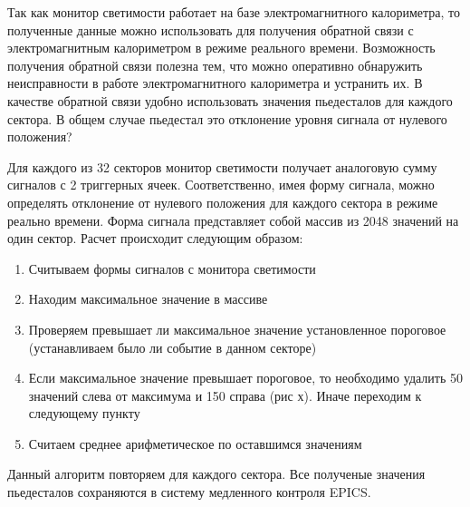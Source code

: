   Так как монитор светимости работает на базе электромагнитного калориметра, то полученные данные можно использовать для получения обратной связи с электромагнитным калориметром в режиме реального времени. Возможность получения обратной связи полезна тем, что можно оперативно обнаружить неисправности в работе электромагнитного калориметра и устранить их. В качестве обратной связи удобно использовать значения пьедесталов для каждого сектора. В общем случае пьедестал это отклонение уровня сигнала от нулевого положения?\par
  Для каждого из 32 секторов монитор светимости получает аналоговую сумму сигналов с 2 триггерных ячеек. Соответственно, имея форму сигнала, можно определять отклонение от нулевого положения для каждого сектора в режиме реально времени. Форма сигнала представляет собой массив из 2048 значений на один сектор. Расчет происходит следующим образом:
\begin{enumerate}
  \item Считываем формы сигналов с монитора светимости
  \item Находим максимальное значение в массиве
  \item Проверяем превышает ли максимальное значение установленное пороговое (устанавливаем было ли событие в данном секторе)
  \item Если максимальное значение превышает пороговое, то необходимо удалить 50 значений слева от максимума и 150 справа (рис х). Иначе переходим к следующему пункту
  \item Считаем среднее арифметическое по оставшимся значениям
\end{enumerate}
Данный алгоритм повторяем для каждого сектора. Все полученые значения пьедесталов сохраняются в систему медленного контроля EPICS.
